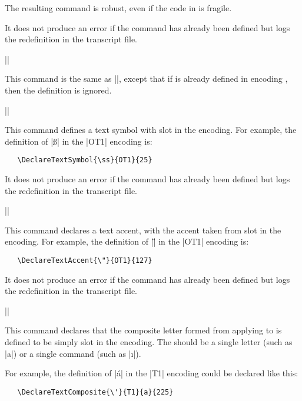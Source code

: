 \documentclass{ltxguide}[1995/11/28]
\begin{document}
The resulting command is
robust, even if the code in  is fragile.
 
It does not produce an error if the command has already
been defined but logs the redefinition in the transcript file.
 
\begin{decl}[1994/12/01]
   |\ProvideTextCommand|  
     
\end{decl}
This command is the same as |\DeclareTextCommand|, except that
if  is already defined in encoding , then the
definition is ignored.
 
\begin{decl}
   |\DeclareTextSymbol|   
\end{decl}
This command defines a text symbol with slot  in the
encoding.  For example, the definition of |\ss| in the |OT1| encoding
is:
\begin{verbatim}
   \DeclareTextSymbol{\ss}{OT1}{25}
\end{verbatim}
It does not produce an error if the command has already
been defined but logs the redefinition in the transcript file.
 
\begin{decl}
   |\DeclareTextAccent|   
\end{decl}
This command declares a text accent, with the accent taken from slot
 in the encoding.  For example, the definition of |\"| in
the |OT1| encoding is:
\begin{verbatim}
   \DeclareTextAccent{\"}{OT1}{127}
\end{verbatim}
It does not produce an error if the command has already
been defined but logs the redefinition in the transcript file.
 
\begin{decl}
   |\DeclareTextComposite|   
\end{decl}
This command declares that the composite letter formed from applying
 to  is defined to be simply slot  in the
encoding.   The  should be a single letter (such as |a|) or
a single command (such as |\i|).
 
 
For example, the definition of |\'{a}|
in the |T1| encoding could be declared like this:
\begin{verbatim}
   \DeclareTextComposite{\'}{T1}{a}{225}
\end{verbatim}
 
\end{document}

